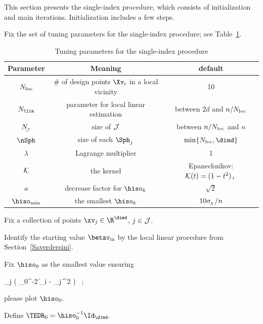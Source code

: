 \label{SaverdersiP}

This section presents the single-index procedure, which consists of initialization and main iterations.
Initialization includes a few steps.

\begin{mylist}
\item
Fix the set of tuning parameters for the single-index procedure; see Table~\ref{TdefMIsi}.
\begin{table}[b]
\begin{tabular}{c|c|c}
        \hline
        Parameter & Meaning & default \\
        \hline
        \( N_{\operatorname{loc}} \) & \( \# \) of design points \( \Xv_{i} \) in a local vicinity & 10 \\
        \( \numb_{\lin} \) & parameter for local linear estimation & 
        between \( 2d \) and \( n/N_{\operatorname{loc}} \) \\
        \( N_{\!_{\mathcal{J}}} \) & size of \( \mathcal{J} \) 				& between \( n/N_{\operatorname{loc}} \) and \( n \) \\
		\( \nSph \) & size of each \( \Sph_{j} \)		& \( \min\{ \nmin, \dimd \} \) \\
		\( \lambda \) & Lagrange multiplier 		& 1 \\
		\( \mathcal{K} \) & the kernel & Epanechnikov: \( \mathcal{K}(t) = (1-t^{2})_{+} \) \\
		\( a \)	& decrease factor for \( \hiso_{k} \) & \( \sqrt{2} \) \\
		\( \hiso_{\min} \) & the smallest \( \hiso_{k} \) & \( 10 \sigma_{\!_{X}}/n \) \\
		\hline
    \end{tabular}
\caption{Tuning parameters for the single-index procedure}    
\label{TdefMIsi}
\end{table}


\item
Fix a collection of points \( \xv_{j} \in \R^{\dimd} \), \( j \in \mathcal{J} \).

\item
Identify the starting value \( \betav_{\init} \) by
the local linear procedure from Section~\ref{Saverdersini}.

\item
Fix \( \hiso_{0} \) as the smallest value ensuring
\begin{EQA}[c]
	 \sum_{j \in \JJJ} 
	\sumi \Kern\bigl( \hiso_{0}^{-2} \| \Xv_{i} - \xv_{j} \|^{2} \bigr)
	\geq 
	\nmin
	\, ;
\end{EQA}
{\color{blue} please plot \( \hiso_{0} \).}
\item
Define \( \TEDR_{0} = \hiso_{0}^{-1} \Id_{\dimd} \).
\end{mylist}




